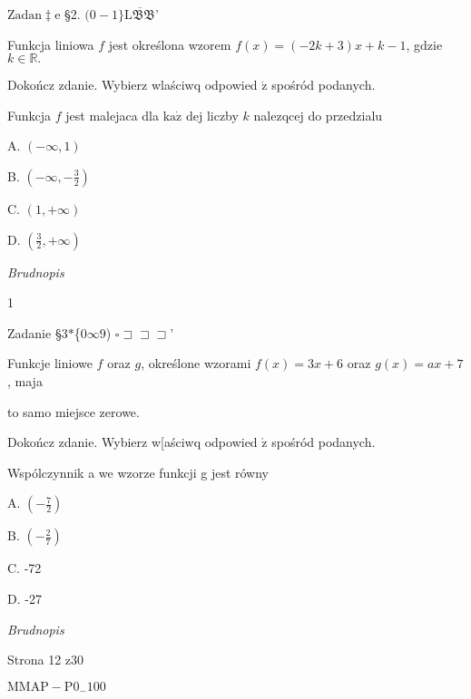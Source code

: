 \documentclass[a4paper,12pt]{article}
\begin{document}
$\mathrm{Z}\mathrm{a}\mathrm{d}\mathrm{a}\mathrm{n}\ddagger \mathrm{e}$ \S 2. $(0-1\} \overline{\mathrm{L}\mathfrak{B}\mathfrak{B}}$'

Funkcja liniowa $f$ jest określona wzorem $f(x)=(-2k+3)x+k-1$, gdzie $k\in \mathbb{R}.$

Dokończ zdanie. Wybierz wlaściwq odpowied $\acute{\mathrm{z}}$ spośród podanych.

Funkcja $f$ jest malejaca dla $\mathrm{k}\mathrm{a}\dot{\mathrm{z}}$ dej liczby $k$ nalezqcej do przedzialu

A. $(-\infty,1)$

B. $(-\displaystyle \infty,-\frac{3}{2})$

C. $(1,+\infty)$

D. $(\displaystyle \frac{3}{2},+\infty)$

{\it Brudnopis}

1

Zadanie \S 3$*$\{0$\infty$9) $\square \sqsupset\sqsupset\sqsupset$'

Funkcje liniowe $f$ oraz $g$, określone wzorami $f(x)=3x+6$ oraz $g(x)=ax+7$, maja

to samo miejsce zerowe.

Dokończ zdanie. Wybierz w[aściwq odpowied $\acute{\mathrm{z}}$ spośród podanych.

Wspólczynnik a we wzorze funkcji g jest równy

A. $(-\displaystyle \frac{7}{2})$

B. $(-\displaystyle \frac{2}{7})$

C. -72

D. -27

{\it Brudnopis}

Strona 12 z30

$\mathrm{M}\mathrm{M}\mathrm{A}\mathrm{P}-\mathrm{P}0_{-}100$
\end{document}
